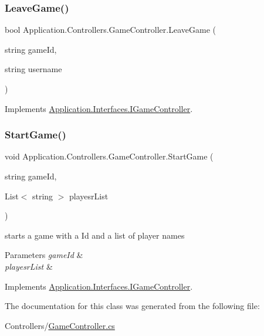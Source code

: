 \subsubsection{\texorpdfstring{Leave\+Game()}{LeaveGame()}}
{\footnotesize\ttfamily bool Application.\+Controllers.\+Game\+Controller.\+Leave\+Game (\begin{DoxyParamCaption}\item[{string}]{game\+Id,  }\item[{string}]{username }\end{DoxyParamCaption})}



Implements \mbox{\hyperlink{interface_application_1_1_interfaces_1_1_i_game_controller_ae81ea4aa4d3146c023277fbf17107623}{Application.\+Interfaces.\+I\+Game\+Controller}}.

\mbox{\label{class_application_1_1_controllers_1_1_game_controller_aca897a6c639e043db85b41049d550cf2}} 
\subsubsection{\texorpdfstring{Start\+Game()}{StartGame()}}
{\footnotesize\ttfamily void Application.\+Controllers.\+Game\+Controller.\+Start\+Game (\begin{DoxyParamCaption}\item[{string}]{game\+Id,  }\item[{List$<$ string $>$}]{playesr\+List }\end{DoxyParamCaption})}



starts a game with a Id and a list of player names 


\begin{DoxyParams}{Parameters}
{\em game\+Id} & \\
\hline
{\em playesr\+List} & \\
\hline
\end{DoxyParams}


Implements \mbox{\hyperlink{interface_application_1_1_interfaces_1_1_i_game_controller_ab3f492a78bbefc5de5dd3de5d1d26f79}{Application.\+Interfaces.\+I\+Game\+Controller}}.



The documentation for this class was generated from the following file\+:\begin{DoxyCompactItemize}
\item 
Controllers/\mbox{\hyperlink{_game_controller_8cs}{Game\+Controller.\+cs}}\end{DoxyCompactItemize}
